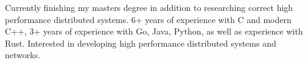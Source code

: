 

\begin{cvparagraph}

Currently finishing my masters degree in addition to researching correct high performance distributed systems. 6+ years of experience with C and modern C++, 3+ years of experience with Go, Java, Python, as well as experience with Rust. 
Interested in developing high performance distributed systems and networks.
\end{cvparagraph}
